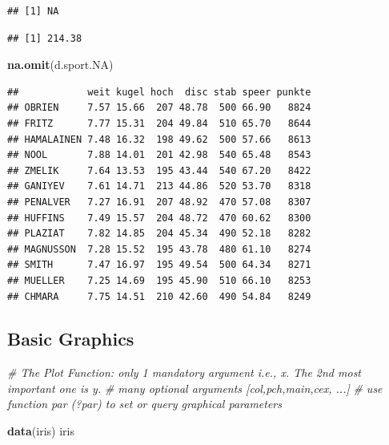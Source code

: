 \documentclass[
]{article}
\newenvironment{Shaded}{\begin{snugshade}}{\end{snugshade}}
\newcommand{\AttributeTok}[1]{\textcolor[rgb]{0.13,0.29,0.53}{#1}}
\newcommand{\CommentTok}[1]{\textcolor[rgb]{0.56,0.35,0.01}{\textit{#1}}}
\newcommand{\ConstantTok}[1]{\textcolor[rgb]{0.56,0.35,0.01}{#1}}
\newcommand{\FunctionTok}[1]{\textcolor[rgb]{0.13,0.29,0.53}{\textbf{#1}}}
\newcommand{\NormalTok}[1]{#1}
\newcommand{\SpecialCharTok}[1]{\textcolor[rgb]{0.81,0.36,0.00}{\textbf{#1}}}
\begin{document}
\begin{verbatim}
## [1] NA
\end{verbatim}

\begin{Shaded}
\end{Shaded}

\begin{verbatim}
## [1] 214.38
\end{verbatim}

\begin{Shaded}
\begin{Highlighting}[]
\FunctionTok{na.omit}\NormalTok{(d.sport.NA)}
\end{Highlighting}
\end{Shaded}

\begin{verbatim}
##            weit kugel hoch  disc stab speer punkte
## OBRIEN     7.57 15.66  207 48.78  500 66.90   8824
## FRITZ      7.77 15.31  204 49.84  510 65.70   8644
## HAMALAINEN 7.48 16.32  198 49.62  500 57.66   8613
## NOOL       7.88 14.01  201 42.98  540 65.48   8543
## ZMELIK     7.64 13.53  195 43.44  540 67.20   8422
## GANIYEV    7.61 14.71  213 44.86  520 53.70   8318
## PENALVER   7.27 16.91  207 48.92  470 57.08   8307
## HUFFINS    7.49 15.57  204 48.72  470 60.62   8300
## PLAZIAT    7.82 14.85  204 45.34  490 52.18   8282
## MAGNUSSON  7.28 15.52  195 43.78  480 61.10   8274
## SMITH      7.47 16.97  195 49.54  500 64.34   8271
## MUELLER    7.25 14.69  195 45.90  510 66.10   8253
## CHMARA     7.75 14.51  210 42.60  490 54.84   8249
\end{verbatim}

\subsection{Basic Graphics}\label{basic-graphics}

\begin{Shaded}
\begin{Highlighting}[]
\CommentTok{\# The Plot Function: only 1 mandatory argument i.e., x. The 2nd most important one is y. }
  \CommentTok{\# many optional arguments [col,pch,main,cex, ...]}
  \CommentTok{\# use function par (?par) to set or query graphical parameters}

\FunctionTok{data}\NormalTok{(iris)}
\NormalTok{iris}
\end{Highlighting}
\end{Shaded}
\end{document}
